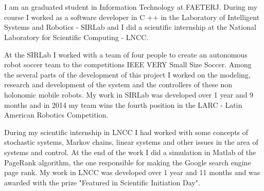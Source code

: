 \documentclass[a4paper]{report} %
\begin{document}
\section*{}
\vspace{-1.3cm}
\subsection*{}

\vspace{1cm}

I am an graduated student in Information Technology at FAETERJ. During my course I worked as a software developer in C ++ in the Laboratory of Intelligent Systems and Robotics - SIRLab and I did a scientific internship at the National Laboratory for Scientific Computing - LNCC.

At the SIRLab I worked with a team of four people to create an autonomous robot soccer team to the competitions IEEE VERY Small Size Soccer. Among the several parts of the development of this project I worked on the modeling, research and development of the system and the controllers of these non holonomic mobile robots. My work in SIRLab was developed over 1 year and 9 months and in 2014 my team wins the fourth position in the LARC - Latin American Robotics Competition.

During my scientific internship in LNCC I had worked with some concepts of stochastic systems, Markov chains, linear systems and other issues in the area of systems and control. At the end of the work I did a simulation in Matlab of the PageRank algorithm, the one responsible for making the Google search engine page rank. My work in LNCC was developed over 1 year and 11 months and was awarded with the prize "Featured in Scientific Initiation Day".

\end{document}
